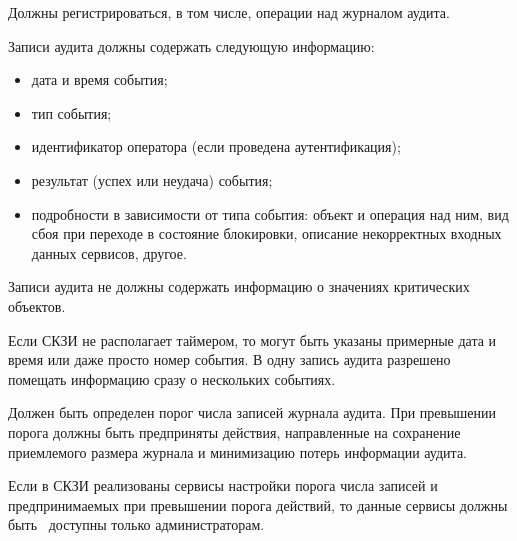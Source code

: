\begin{note}
Должны регистрироваться, в том числе, операции над журналом аудита.
\end{note}

\label{R.AU.Records}
Записи аудита должны содержать следующую информацию:
\begin{itemize} 
\item
дата и время события;
\item
тип события; 
\item
идентификатор оператора (если проведена аутентификация); 
\item
результат (успех или неудача) события; 
\item
подробности в зависимости от типа события:
объект и операция над ним,
вид сбоя при переходе в состояние блокировки,
описание некорректных входных данных сервисов,
другое.
\end{itemize}
Записи аудита не должны содержать информацию о значениях критических объектов.  

\begin{note}
Если СКЗИ не располагает таймером, то могут быть указаны примерные дата и время
или даже просто номер события.
%
В одну запись аудита разрешено помещать информацию сразу о нескольких событиях. 
\end{note}


\label{R.AU.Over}
Должен быть определен порог числа записей журнала аудита.
При превышении порога должны быть предприняты действия,
направленные на сохранение приемлемого размера журнала
и минимизацию потерь информации аудита.

\label{R.AU.Settings}
Если в СКЗИ реализованы сервисы настройки порога числа записей и 
предпринимаемых при превышении порога действий, то данные сервисы должны 
быть~ доступны только администраторам. 

